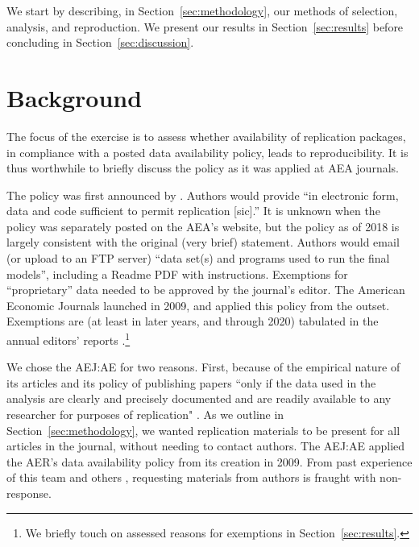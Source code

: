 \documentclass{cje} %
\theoremstyle{plain}%
\theoremstyle{definition}
\theoremstyle{remark}
\begin{document}
We start by describing, in Section~\ref{sec:methodology}, our methods of selection, analysis, and reproduction. We present our results in Section~\ref{sec:results} before concluding in Section~\ref{sec:discussion}.

\section{Background}\label{sec:background}
% 
%
The focus of the exercise is to assess whether availability of replication packages, in compliance with a posted data availability policy, leads to reproducibility. It is thus worthwhile to briefly discuss the policy as it was applied at AEA journals. 

The policy was first announced by \citep{bernanke2004}. Authors would provide ``in electronic form, data and code sufficient to permit replication [sic].'' It is unknown when the policy was separately posted on the AEA's website, but the policy as of 2018  \citep{American_Economic_Association2008-wayback} is largely consistent with the original (very brief) statement. Authors would email (or upload to an FTP server) ``data set(s) and programs used to run the final models'', including a Readme PDF with instructions. Exemptions for ``proprietary'' data needed to be approved by the journal's editor. The American Economic Journals launched in 2009, and applied this policy from the outset. Exemptions are (at least in later years, and through 2020) tabulated in the annual editors' reports \citep[see f.i.][]{mas2019}.\footnote{We briefly touch on assessed reasons for exemptions in Section~\ref{sec:results}.} 

We chose the \ac{AEJ:AE}  for two reasons. First, because of the empirical nature of its articles and its policy of publishing papers ``only if the data used in the analysis are clearly and precisely documented and are readily available to any researcher for purposes of replication" \citep{American_Economic_Association2008-wayback}. As we outline in Section~\ref{sec:methodology}, we wanted replication materials to be present for all articles in the journal, without needing to contact authors. The \ac{AEJ:AE} applied the AER's data availability policy from its creation in 2009. From past experience of this team \citep{vilhuber2020a} and others \citep[e.g.][]{Dewald1986,McCullough03,Stodden2018}, requesting materials from authors is fraught with non-response. 
\end{document}

